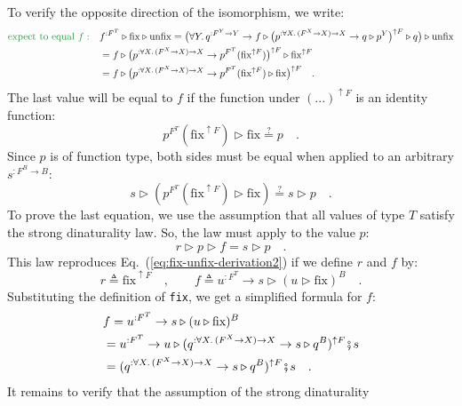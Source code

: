 To verify the opposite direction of the isomorphism, we write:
\begin{align*}
{\color{greenunder}\text{expect to equal }f:}\quad & f^{:F^{T}}\triangleright\text{fix}\triangleright\text{unfix}=\big(\forall Y.\,q^{:F^{Y}\rightarrow Y}\rightarrow f\triangleright\big(p^{:\forall X.\,(F^{X}\rightarrow X)\rightarrow X}\rightarrow q\triangleright p^{Y}\big)^{\uparrow F}\triangleright q\big)\triangleright\text{unfix}\\
 & =f\triangleright\big(p^{:\forall X.\,(F^{X}\rightarrow X)\rightarrow X}\rightarrow p^{F^{T}}(\text{fix}^{\uparrow F})\big)^{\uparrow F}\triangleright\text{fix}^{\uparrow F}\\
 & =f\triangleright\big(p^{:\forall X.\,(F^{X}\rightarrow X)\rightarrow X}\rightarrow p^{F^{T}}(\text{fix}^{\uparrow F})\triangleright\text{fix}\big)^{\uparrow F}\quad.
\end{align*}
The last value will be equal to $f$ if the function under $(...)^{\uparrow F}$
is an identity function:
\[
p^{F^{T}}(\text{fix}^{\uparrow F})\triangleright\text{fix}\overset{?}{=}p\quad.
\]
Since $p$ is of function type, both sides must be equal when applied
to an arbitrary $s^{:F^{B}\rightarrow B}$:
\begin{equation}
s\triangleright(p^{F^{T}}(\text{fix}^{\uparrow F})\triangleright\text{fix})\overset{?}{=}s\triangleright p\quad.\label{eq:fix-unfix-derivation2}
\end{equation}
To prove the last equation, we use the assumption that all values
of type $T$ satisfy the strong dinaturality law. So, the law must
apply to the value $p$:
\[
r\triangleright p\triangleright f=s\triangleright p\quad.
\]
This law reproduces Eq.~(\ref{eq:fix-unfix-derivation2}) if we define
$r$ and $f$ by:
\[
r\triangleq\text{fix}^{\uparrow F}\quad,\quad\quad f\triangleq u^{:F^{T}}\rightarrow s\triangleright(u\triangleright\text{fix})^{B}\quad.
\]
Substituting the definition of \lstinline!fix!, we get a simplified
formula for $f$:
\begin{align*}
 & f=u^{:F^{T}}\rightarrow s\triangleright(u\triangleright\text{fix})^{B}\\
 & =u^{:F^{T}}\rightarrow u\triangleright(q^{:\forall X.\,(F^{X}\rightarrow X)\rightarrow X}\rightarrow s\triangleright q^{B})^{\uparrow F}\bef s\\
 & =(q^{:\forall X.\,(F^{X}\rightarrow X)\rightarrow X}\rightarrow s\triangleright q^{B})^{\uparrow F}\bef s\quad.
\end{align*}
It remains to verify that the assumption of the strong dinaturality
